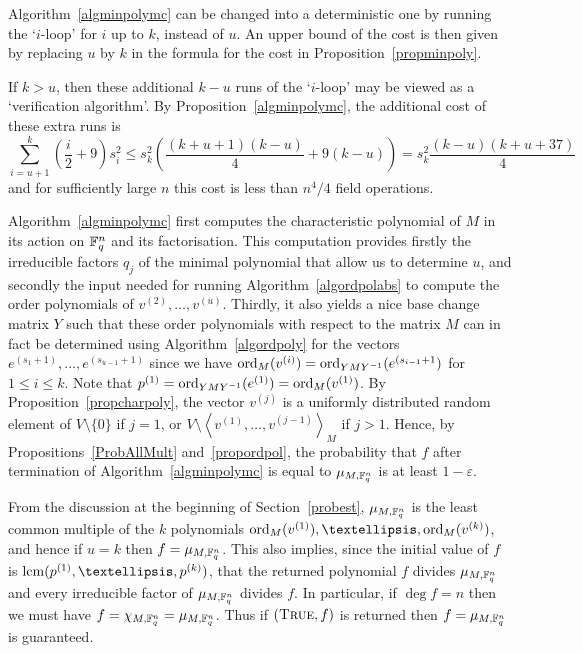 \begin{Rem}
    \label{algdeterm}
    Algorithm~\ref{algminpolymc} can be changed into a deterministic
    one by running the `$i$-loop' for $i$ up to $k$, instead of $u$. An upper
    bound of the cost is then given by replacing $u$ by $k$ in the
    formula for the cost in Proposition~\ref{propminpoly}.

If $k>u$, then these additional $k-u$ runs of the `$i$-loop' may be viewed as 
a `verification  algorithm'. By Proposition~\ref{algminpolymc}, 
%
the additional cost of these extra runs is
\[
\sum_{i=u+1}^k(\frac{i}{2}+9)s_i^2 \leq s_k^2\left(\frac{(k+u+1)(k-u)}{4}+9(k-u)\right)
= s_k^2\frac{(k-u)(k+u+37)}{4}
\]
and for sufficiently large $n$ this cost is less than 
$n^4/4$ field operations.
\end{Rem}

Algorithm~\ref{algminpolymc} first computes the characteristic
polynomial of $M$ in its action on $\mathbb{F}_q^n$ and its factorisation.
This computation provides firstly the irreducible factors $q_j$ of
the minimal polynomial that allow us to determine $u$, and secondly
the input needed for running Algorithm~\ref{algordpolabs} to compute
the order polynomials of $v^{(2)}, \ldots, 
v^{(u)}$. Thirdly, it also yields a nice base change matrix $Y$ such 
that these order polynomials with respect to the matrix $M$ can in
fact be determined using Algorithm~\ref{algordpoly} for the vectors
$e^{(s_1+1)},\ldots,e^{(s_{u-1}+1)}$ since we have
$\mathrm{ord}_M(v^{(i)}) = \mathrm{ord}_{YMY^{-1}}(e^{(s_{i-1}+1})$ for $1 \le i \le
k$. Note that
$p^{(1)} = \mathrm{ord}_{YMY^{-1}}(e^{(1)}) = \mathrm{ord}_M(v^{(1)})$. 
By Proposition~\ref{propcharpoly},
the vector $v^{(j)}$ is a uniformly distributed random element of
$V\setminus\{0\}$ if $j=1$, or $V\setminus\left< v^{(1)}, \ldots,
v^{(j-1)}\right>_M$ if $j>1$. Hence, by Propositions~\ref{ProbAllMult}
and~\ref{propordpol}, the probability that $f$ after termination of
Algorithm~\ref{algminpolymc} is equal to $\mu_{M,\mathbb{F}_q^n}$ is at least
$1-\varepsilon$.

  From the discussion at the beginning of Section~\ref{probest},
$\mu_{M,\mathbb{F}_q^n}$ is the least common multiple of the $k$ polynomials
$\ord_M(v^{(1)}), \dots,\ord_M(v^{(k)})$, and hence if $u=k$ then
$f = \mu_{M,\mathbb{F}_q^n}$. This also implies, since the initial value
of $f$ is $\lcm(p^{(1)}, \ldots, p^{(k)})$, that the returned
polynomial $f$ divides $\mu_{M,\mathbb{F}_q^n}$ and every irreducible factor of
$\mu_{M,\mathbb{F}_q^n}$ divides $f$. In particular, if $\deg f =n$ then we must
have $f=\chi_{M,\mathbb{F}_q^n}=\mu_{M,\mathbb{F}_q^n}$. Thus if $(\mbox{\sc True},f)$
is returned then $f = \mu_{M,\mathbb{F}_q^n}$ is guaranteed.


